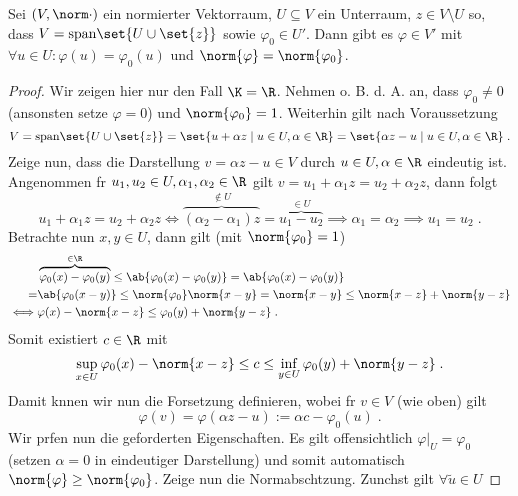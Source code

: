 	\begin{lemma}
		Sei \((V,\norm\cdot)\) ein normierter Vektorraum, \(U\subseteq V\) ein Unterraum, \(z \in V\setminus U\) so, dass \(V = \text{span}\set{U \cup \set{z}}\) sowie \(\varphi_0 \in U'\). Dann gibt es \(\varphi \in V'\) mit \(\forall u \in U: \varphi(u) = \varphi_0(u)\) und \(\norm{\varphi} = \norm{\varphi_0}\).
		\label{Lemma_Hahn_Banach}
	\end{lemma}
	\begin{proof}
		Wir zeigen hier nur den Fall \(\K = \R\). Nehmen o. B. d. A. an, dass \(\varphi_0 \neq 0\) (ansonsten setze \(\varphi = 0\)) und \(\norm{\varphi_0} = 1\). Weiterhin gilt nach Voraussetzung
		\[V = \text{span}\set{U\cup\set{z}} = \set{u + \alpha z \;\vert\; u \in U, \alpha \in \R} = \set{\alpha z - u \;\vert\; u \in U, \alpha\in \R}\;.\]
		Zeige nun, dass die Darstellung \(v = \alpha z - u \in V\) durch \(u\in U, \alpha \in \R\) eindeutig ist. Angenommen f\us r \(u_1, u_2 \in U, \alpha_1, \alpha_2 \in \R\) gilt \(v = u_1 + \alpha_1 z = u_2 + \alpha_2 z\), dann folgt
		\[u_1 + \alpha_1 z = u_2 + \alpha_2 z \iff \overbrace{(\alpha_2 - \alpha_1)z}^{\not\in U} = \overbrace{u_1 - u_2}^{\in U}\implies \alpha_1 = \alpha_2 \implies u_1 = u_2\;.\]
		Betrachte nun \(x,y \in U\), dann gilt (mit \(\norm{\varphi_0} = 1\))
		\begin{align*}&\overbrace{\varphi_0(x) -\varphi_0(y)}^{\in \R} \leq \ab{\varphi_0(x) -\varphi_0(y)} = \ab{\varphi_0(x) -\varphi_0(y)} \\= &\ab{\varphi_0(x-y)} \leq \norm{\varphi_0} \norm{x-y}  
			= \norm{x-y} \leq \norm{x-z} + \norm{y-z} \\ \iff &\varphi(x) - \norm{x-z} \leq \varphi_0(y) + \norm{y-z}\;.
			\end{align*}
			Somit existiert \(c\in \R\) mit 
			\[\sup_{x\in U}\varphi_0(x) - \norm{x-z}\leq c \leq \inf_{y\in U} \varphi_0(y) + \norm{y-z}\;.\]
			Damit k\os nnen wir nun die Forsetzung definieren, wobei f\us r \(v \in V\) (wie oben) gilt
			\[\varphi(v) = \varphi(\alpha z - u) := \alpha c - \varphi_0(u)\;.\]
			Wir pr\us fen nun die geforderten Eigenschaften. Es gilt offensichtlich \(\varphi\vert_U = \varphi_0\) (setzen \(\alpha = 0\) in eindeutiger Darstellung) und somit automatisch 
			\(\norm{\varphi} \geq \norm{\varphi_0}\). Zeige nun die Normabsch\as tzung. Zun\as chst gilt  \(\forall\tilde u \in U\)

\end{proof}
